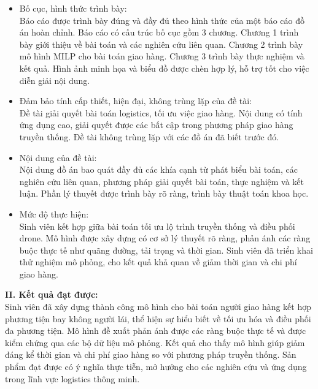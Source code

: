 \begin{itemize}
    \item[-] Bố cục, hình thức trình bày:\\
    Báo cáo được trình bày đúng và đầy đủ theo hình thức của một báo cáo đồ án hoàn chỉnh. Báo cáo có cấu trúc bố cục gồm 3 chương. Chương 1 trình bày giới thiệu về bài toán và các nghiên cứu liên quan. Chương 2 trình bày mô hình MILP cho bài toán giao hàng. Chương 3 trình bày thực nghiệm và kết quả. Hình ảnh minh họa và biểu đồ được chèn hợp lý, hỗ trợ tốt cho việc diễn giải nội dung.

    \item[-] Đảm bảo tính cấp thiết, hiện đại, không trùng lặp của đề tài:\\
    Đề tài giải quyết bài toán logistics, tối ưu việc giao hàng. Nội dung có tính ứng dụng cao, giải quyết được các bất cập trong phương pháp giao hàng truyền thống. Đề tài không trùng lặp với các đồ án đã biết trước đó.

    \item[-] Nội dung của đề tài:\\
    Nội dung đồ án bao quát đầy đủ các khía cạnh từ phát biểu bài toán, các nghiên cứu liên quan, phương pháp giải quyết bài toán, thực nghiệm và kết luận. Phần lý thuyết được trình bày rõ ràng, trình bày thuật toán khoa học.

    \item[-] Mức độ thực hiện:\\
    Sinh viên kết hợp giữa bài toán tối ưu lộ trình truyền thống và điều phối drone. Mô hình được xây dựng có cơ sở lý thuyết rõ ràng, phản ánh các ràng buộc thực tế như quãng đường, tải trọng và thời gian. Sinh viên đã triển khai thử nghiệm mô phỏng, cho kết quả khả quan về giảm thời gian và chi phí giao hàng.
\end{itemize}

\noindent\textbf{II. Kết quả đạt được:}\\[0.2cm]
Sinh viên đã xây dựng thành công mô hình cho bài toán người giao hàng kết hợp phương tiện bay không người lái, thể hiện sự hiểu biết về tối ưu hóa và điều phối đa phương tiện. Mô hình đề xuất phản ánh được các ràng buộc thực tế và được kiểm chứng qua các bộ dữ liệu mô phỏng. Kết quả cho thấy mô hình giúp giảm đáng kể thời gian và chi phí giao hàng so với phương pháp truyền thống. Sản phẩm đạt được có ý nghĩa thực tiễn, mở hướng cho các nghiên cứu và ứng dụng trong lĩnh vực logistics thông minh.

